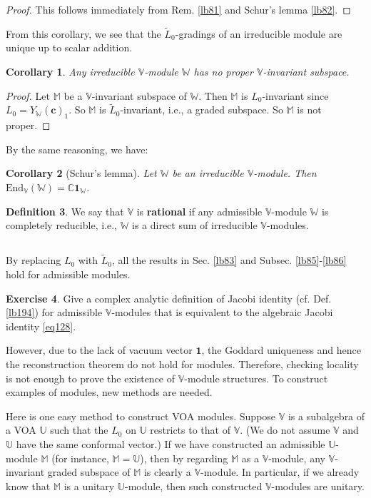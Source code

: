 \documentclass[11pt,b5paper,notitlepage]{article}
\theoremstyle{definition}
\newtheorem{df}{Definition}[section]
\newtheorem{exe}[df]{Exercise}
\theoremstyle{plain}
\newtheorem{co}[df]{Corollary}
\newcommand{\wtd}{\widetilde}
\newcommand{\End}{\mathrm{End}} %
\newcommand{\id}{\mathbf{1}}
\newcommand{\Vbb}{\mathbb V}
\newcommand{\Ubb}{\mathbb U}
\newcommand{\Wbb}{\mathbb W}
\newcommand{\Mbb}{\mathbb M}
\newcommand{\Cbb}{\mathbb C}
\newcommand{\cbf}{\mathbf c}
\numberwithin{equation}{section}
\begin{document}
\begin{proof}
This follows immediately from Rem. \ref{lb81} and Schur's lemma \ref{lb82}.
\end{proof}

From this corollary, we see that the $\wtd L_0$-gradings of an irreducible module are unique up to scalar addition.

\begin{co}
Any irreducible $\Vbb$-module $\Wbb$ has no proper $\Vbb$-invariant subspace.
\end{co}


\begin{proof}
Let $\Mbb$ be a $\Vbb$-invariant subspace of $\Wbb$. Then $\Mbb$ is $L_0$-invariant since $L_0=Y_\Wbb(\cbf)_1$. So $\Mbb$ is $\wtd L_0$-invariant, i.e., a graded subspace. So $\Mbb$ is not proper.
\end{proof}

By the same reasoning, we have:
\begin{co}[Schur's lemma]
Let $\Wbb$ be an irreducible $\Vbb$-module. Then $\End_\Vbb(\Wbb)=\Cbb\id_\Wbb$.
\end{co}


\begin{df}\label{lb164}
We say that $\Vbb$ is \textbf{rational}  if any admissible $\Vbb$-module $\Wbb$ is completely reducible, i.e., $\Wbb$ is a direct sum of irreducible $\Vbb$-modules.
\end{df}




\subsection{}

By replacing $L_0$ with $\wtd L_0$, all the results in Sec. \ref{lb83} and Subsec. \ref{lb85}-\ref{lb86} hold for admissible modules. 
\begin{exe}
Give a complex analytic definition of Jacobi identity (cf. Def. \ref{lb194}) for admissible $\Vbb$-modules that is equivalent to the algebraic Jacobi identity \eqref{eq128}.
\end{exe}
However, due to the lack of vacuum vector $\id$, the Goddard uniqueness and hence the reconstruction theorem do not hold for modules. Therefore, checking locality is not enough to prove the existence of $\Vbb$-module structures. To construct examples of modules, new methods are needed. 

Here is one easy method to construct VOA modules. Suppose $\Vbb$ is a subalgebra of a VOA $\Ubb$ such that the $L_0$ on $\Ubb$ restricts to that of $\Vbb$. (We do not assume $\Vbb$ and $\Ubb$ have the same conformal vector.) If we have constructed an admissible $\Ubb$-module $\Mbb$ (for instance, $\Mbb=\Ubb$), then by regarding $\Mbb$ as a $\Vbb$-module, any $\Vbb$-invariant graded subspace of $\Mbb$ is clearly a $\Vbb$-module.  In particular, if we already know that $\Mbb$ is a unitary $\Ubb$-module, then such constructed $\Vbb$-modules are unitary. 
\end{document}
